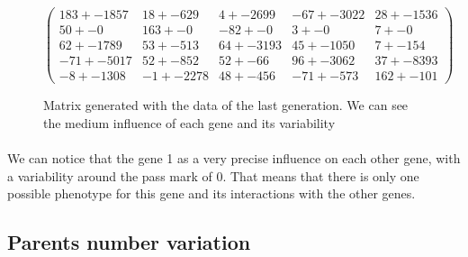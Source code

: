 \documentclass[]{report} %
\begin{document}
    \begin{figure}[H] 
            \centering
            \small
    $
          \begin{pmatrix}
                183 +- 1857 & 18 +- 629 & 4 +- 2699 & -67 +- 3022 & 28 +- 1536 \\
                50 +- 0 & 163 +- 0 & -82 +- 0 & 3 +- 0 & 7 +- 0 \\
                62 +- 1789 & 53 +- 513 & 64 +- 3193 & 45 +- 1050 & 7 +- 154 \\
                -71 +- 5017 & 52 +- 852 & 52 +- 66 & 96 +- 3062 & 37 +- 8393 \\
                -8 +- 1308 & -1 +- 2278 & 48 +- 456 & -71 +- 573 & 162 +- 101 
          \end{pmatrix}
    $
            \caption{\footnotesize Matrix generated with the data of the last generation. We can see the medium influence of each gene and its variability}
            \label{mat:ps300xg200xmr1-10-10}
    \end{figure}
    \paragraph*{}
    We can notice that the gene 1 as a very precise influence on each other gene, with a variability around the pass mark of  0. That means that there is only one possible phenotype for this gene and its interactions with the other genes.
    
    
\subsection{Parents number variation}
\end{document}
